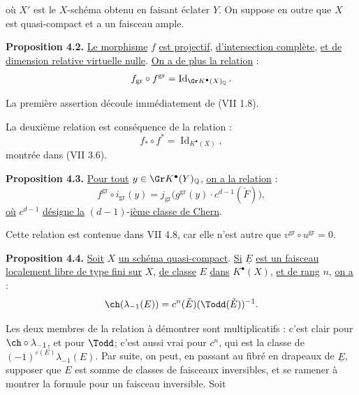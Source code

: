 
où \(X'\) est le \(X\)-schéma
obtenu en faisant éclater \(Y\). On suppose en outre que \(X\) est quasi-compact et a un faisceau ample.

\textbf{Proposition 4.2.} \uline{Le morphisme} \(f\) \uline{est projectif}, \uline{d'intersection complète}, \uline{et de dimension relative virtuelle nulle}. \uline{On a de plus la relation} :
\[
 f_{\mathrm{gr}}\circ f^{\mathrm{gr}}=\operatorname{Id}_{\Gr K^{\bullet}(X)_{\mathbb Q}} .
\]

La première assertion découle immédiatement de (VII 1.8).

La deuxième relation est conséquence de la relation :
\[
 f_*\circ f^*=\operatorname{Id}_{K^{\bullet}(X)},
\]
montrée dans (VII 3.6).

\textbf{Proposition 4.3.} \uline{Pour tout} \(y\in \Gr K^{\bullet}(Y)_{\mathbb Q}\), \uline{on a la relation} :
\[
 f^{\mathrm{gr}}\circ i_{\mathrm{gr}}(y)
 =
 j_{\mathrm{gr}}\bigl(g^{\mathrm{gr}}(y)\cdot c^{d-1}(\check F)\bigr),
\]
\uline{où} \(c^{d-1}\) \uline{désigne la} \((d-1)\)-\uline{ième classe de Chern}.

Cette relation est contenue dans VII 4.8, car elle n'est autre que \(v^{\mathrm{gr}}\circ u^{\mathrm{gr}}=0\).

\textbf{Proposition 4.4.} \uline{Soit} \(X\) \uline{un schéma quasi-compact}. \uline{Si} \(\underline{E}\) \uline{est un faisceau localement libre de type fini sur} \(X\), \uline{de classe} \(E\) \uline{dans} \(K^{\bullet}(X)\), \uline{et de rang} \(n\), \uline{on a} :
\[
 \ch(\lambda_{-1}(E))=c^n(\check E)(\Todd(\check E))^{-1}.
\]

Les deux membres de la relation à démontrer sont multiplicatifs : c'est clair pour \(\ch\circ\lambda_{-1}\), et pour \(\Todd\); c'est aussi vrai pour \(c^n\), qui est la classe de \((-1)^{\varepsilon(E)}\lambda_{-1}(E)\). Par suite, on peut, en passant au fibré en drapeaux de \(\underline{E}\), supposer que \(E\) est somme de classes de faisceaux inversibles, et se ramener à montrer la formule pour un faisceau inversible. Soit
